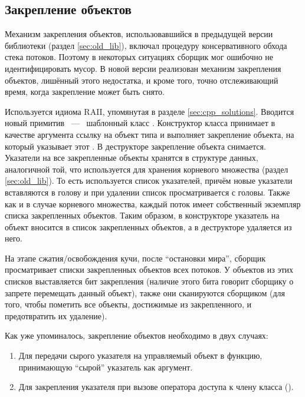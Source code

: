\subsection{Закрепление объектов}
Механизм закрепления объектов, использовавшийся в предыдущей версии библиотеки 
(раздел \ref{sec:old_lib}), включал процедуру консервативного обхода стека потоков. 
Поэтому в некоторых ситуациях сборщик мог ошибочно не идентифицировать мусор. 
В новой версии реализован механизм закрепления объектов, лишённый этого недостатка, и 
кроме того, точно отслеживающий время, когда закрепление может быть снято.

Используется идиома RAII, упомянутая в разделе \ref{sec:cpp_solutions}. 
Вводится новый примитив ~---~ шаблонный класс . 
Конструктор класса  принимает в качестве аргумента ссылку на объект типа 
 и выполняет закрепление объекта, на который указывает этот . 
В деструкторе  закрепление объекта снимается. 
Указатели на все закрепленные объекты хранятся в структуре данных, аналогичной той, 
что используется для хранения корневого множества (раздел \ref{sec:old_lib}). 
То есть используется список указателей, причём новые указатели вставляются в голову и 
при удалении список просматривается с головы. 
Также как и в случае корневого множества, каждый поток имеет собственный экземпляр списка 
закрепленных объектов. 
Таким образом, в конструкторе  указатель на объект вносится в список 
закрепленных объектов, а в деструкторе удаляется из него.

На этапе сжатия/освобождения кучи, после ``остановки мира'', сборщик просматривает списки 
закрепленных объектов всех потоков. 
У объектов из этих списков выставляется бит закрепления (наличие этого бита говорит сборщику 
о запрете перемещать данный объект), также они сканируются сборщиком (для того, чтобы 
пометить все объекты, достижимые из закрепленного, и предотвратить их удаление). 

Как уже упоминалось, закрепление объектов необходимо в двух случаях:
\begin{enumerate}
\item 
    Для передачи сырого указателя на управляемый объект в функцию, принимающую ``сырой'' 
    указатель как аргумент.
\item 
    Для закрепления указателя  при вызове оператора доступа к члену класса 
    ().
\end{enumerate}

